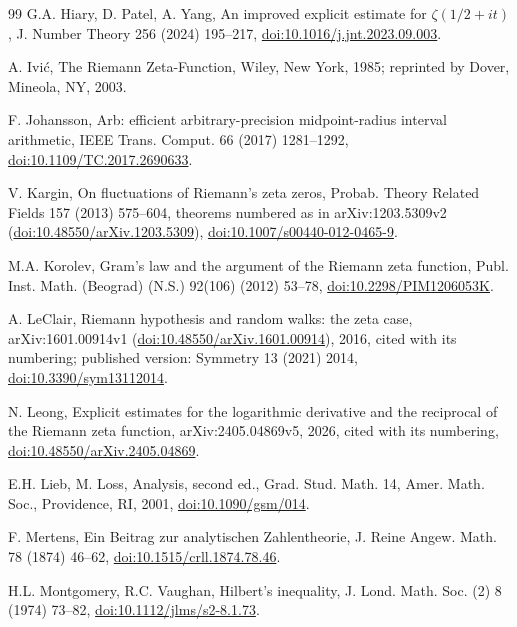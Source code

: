 \documentclass[11pt,a4paper]{article}
\numberwithin{equation}{section}
\theoremstyle{definition}
\theoremstyle{remark}
\begin{document}
\begin{thebibliography}{99}
 G.A. Hiary, D. Patel, A. Yang, An improved explicit estimate for $\zeta(1/2+it)$, J. Number Theory 256 (2024) 195--217, \href{https://doi.org/10.1016/j.jnt.2023.09.003}{doi:10.1016/j.jnt.2023.09.003}.

 A. Ivi\'c, The Riemann Zeta-Function, Wiley, New York, 1985; reprinted by Dover, Mineola, NY, 2003.

 F. Johansson, Arb: efficient arbitrary-precision midpoint-radius interval arithmetic, IEEE Trans. Comput. 66 (2017) 1281--1292, \href{https://doi.org/10.1109/TC.2017.2690633}{doi:10.1109/TC.2017.2690633}.

 V. Kargin, On fluctuations of Riemann's zeta zeros, Probab. Theory Related Fields 157 (2013) 575--604, theorems numbered as in arXiv:1203.5309v2 (\href{https://doi.org/10.48550/arXiv.1203.5309}{doi:10.48550/arXiv.1203.5309}), \href{https://doi.org/10.1007/s00440-012-0465-9}{doi:10.1007/s00440-012-0465-9}.

 M.A. Korolev, Gram's law and the argument of the Riemann zeta function, Publ. Inst. Math. (Beograd) (N.S.) 92(106) (2012) 53--78, \href{https://doi.org/10.2298/PIM1206053K}{doi:10.2298/PIM1206053K}.

 A. LeClair, Riemann hypothesis and random walks: the zeta case, arXiv:1601.00914v1 (\href{https://doi.org/10.48550/arXiv.1601.00914}{doi:10.48550/arXiv.1601.00914}), 2016, cited with its numbering; published version: Symmetry 13 (2021) 2014, \href{https://doi.org/10.3390/sym13112014}{doi:10.3390/sym13112014}.

 N. Leong, Explicit estimates for the logarithmic derivative and the reciprocal of the Riemann zeta function, arXiv:2405.04869v5, 2026, cited with its numbering, \href{https://doi.org/10.48550/arXiv.2405.04869}{doi:10.48550/arXiv.2405.04869}.

 E.H. Lieb, M. Loss, Analysis, second ed., Grad. Stud. Math. 14, Amer. Math. Soc., Providence, RI, 2001, \href{https://doi.org/10.1090/gsm/014}{doi:10.1090/gsm/014}.

 F. Mertens, Ein Beitrag zur analytischen Zahlentheorie, J. Reine Angew. Math. 78 (1874) 46--62, \href{https://doi.org/10.1515/crll.1874.78.46}{doi:10.1515/crll.1874.78.46}.

 H.L. Montgomery, R.C. Vaughan, Hilbert's inequality, J. Lond. Math. Soc. (2) 8 (1974) 73--82, \href{https://doi.org/10.1112/jlms/s2-8.1.73}{doi:10.1112/jlms/s2-8.1.73}.


\end{thebibliography}
\end{document}
